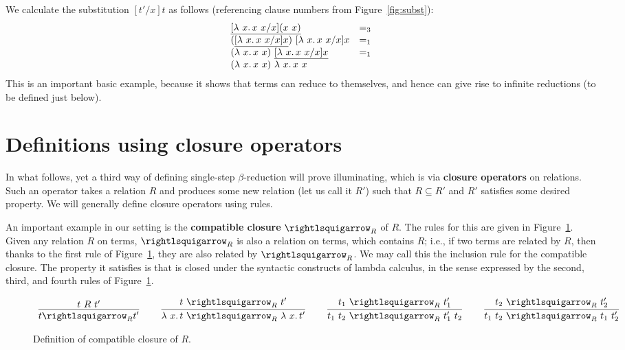 \begin{enumerate}
    We calculate the substitution $[t'/x]t$ as follows (referencing clause numbers from Figure~\ref{fig:subst}):
    \[
    \begin{array}{ll}
      \underline{[\lam{x}{x\ x} / x](x\ x)} & =_3 \\
      (\underline{[\lam{x}{x\ x} / x]x})\ [\lam{x}{x\ x} / x]x & =_1 \\
      (\lam{x}{x\ x})\ \underline{[\lam{x}{x\ x} / x]x} & =_1 \\
      (\lam{x}{x\ x})\ \lam{x}{x\ x} & \ 
    \end{array}
    \]
    \noindent This is an important basic example, because it shows
    that terms can reduce to themselves, and hence can give rise to
    infinite reductions (to be defined just below).
    \end{enumerate}

\section{Definitions using closure operators}
\label{sec:clos}

In what follows, yet a third way of defining single-step
$\beta$-reduction will prove illuminating, which is via
\textbf{closure operators} on relations.
Such an operator takes a relation $R$ and produces some new relation (let us
call it $R'$) such that $R\subseteq R'$ and $R'$ satisfies some desired property.
We will generally define closure operators using rules.

An important example in our setting is the \textbf{compatible closure}
$\curva_R$ of $R$. \index{compatible closure} The rules for this are
given in Figure~\ref{fig:compcl}.  Given any relation $R$ on terms,
$\curva_R$ is also a relation on terms, which contains $R$; i.e., if
two terms are related by $R$, then thanks to the first rule of
Figure~\ref{fig:compcl}, they are also related by $\curva_R$.  We may
call this the inclusion rule for the compatible closure. 
The property it satisfies is that is closed under the syntactic constructs
of lambda calculus, in the sense expressed by the second, third, and
fourth rules of Figure~\ref{fig:compcl}.


\begin{figure}
  \[
  \begin{array}{lllllll}
\infer{t \curva_R t'}{t\ R\ t' } & \ &
\infer{\lam{x}{t}\ \curva_R\ \lam{x}{t'}}{t\ \curva_R\ t'} & \ &
\infer{t_1\ t_2\ \curva_R\ t_1'\ t_2}{t_1\ \curva_R\ t_1'} &\ &
\infer{t_1\ t_2\ \curva_R\ t_1\ t_2'}{t_2\ \curva_R\ t_2'}
  \end{array}
  \]
  \caption{Definition of compatible closure of $R$.}
  \label{fig:compcl}
\end{figure}


